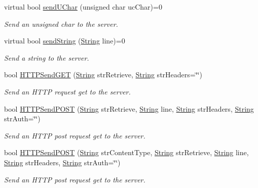 \begin{DoxyCompactItemize}
virtual bool \hyperlink{class_rad_j_a_v_1_1_networking_1_1_tcpip_client_a27e9adfc9d218a82cca52bdbe50c8ebf}{send\+U\+Char} (unsigned char uc\+Char)=0
\begin{DoxyCompactList}\small\item\em Send an unsigned char to the server. \end{DoxyCompactList}\item 
virtual bool \hyperlink{class_rad_j_a_v_1_1_networking_1_1_tcpip_client_abb5360e05cb078ed7cdc42bc70ffc3ab}{send\+String} (\hyperlink{class_rad_j_a_v_1_1_string}{String} line)=0
\begin{DoxyCompactList}\small\item\em Send a string to the server. \end{DoxyCompactList}\item 
bool \hyperlink{class_rad_j_a_v_1_1_networking_1_1_tcpip_client_a91ea7348351c25b23e318088f3dad2a8}{H\+T\+T\+P\+Send\+G\+ET} (\hyperlink{class_rad_j_a_v_1_1_string}{String} str\+Retrieve, \hyperlink{class_rad_j_a_v_1_1_string}{String} str\+Headers=\char`\"{}\char`\"{})
\begin{DoxyCompactList}\small\item\em Send an H\+T\+TP request get to the server. \end{DoxyCompactList}\item 
bool \hyperlink{class_rad_j_a_v_1_1_networking_1_1_tcpip_client_aa4b9f535d3b34da9bcfede602b1b09ef}{H\+T\+T\+P\+Send\+P\+O\+ST} (\hyperlink{class_rad_j_a_v_1_1_string}{String} str\+Retrieve, \hyperlink{class_rad_j_a_v_1_1_string}{String} line, \hyperlink{class_rad_j_a_v_1_1_string}{String} str\+Headers, \hyperlink{class_rad_j_a_v_1_1_string}{String} str\+Auth=\char`\"{}\char`\"{})
\begin{DoxyCompactList}\small\item\em Send an H\+T\+TP post request get to the server. \end{DoxyCompactList}\item 
bool \hyperlink{class_rad_j_a_v_1_1_networking_1_1_tcpip_client_a396c8c2729b10ece40ff82b733a89cc0}{H\+T\+T\+P\+Send\+P\+O\+ST} (\hyperlink{class_rad_j_a_v_1_1_string}{String} str\+Content\+Type, \hyperlink{class_rad_j_a_v_1_1_string}{String} str\+Retrieve, \hyperlink{class_rad_j_a_v_1_1_string}{String} line, \hyperlink{class_rad_j_a_v_1_1_string}{String} str\+Headers, \hyperlink{class_rad_j_a_v_1_1_string}{String} str\+Auth=\char`\"{}\char`\"{})
\begin{DoxyCompactList}\small\item\em Send an H\+T\+TP post request get to the server. \end{DoxyCompactList}\item 

\end{DoxyCompactItemize}

